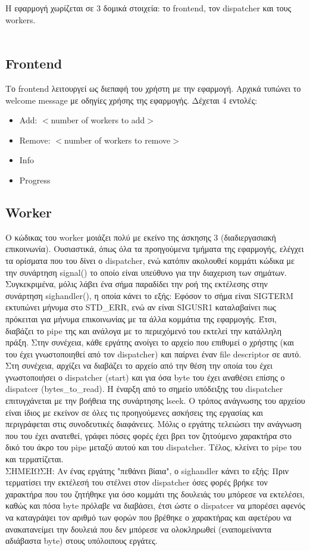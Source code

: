 \documentclass{article}
\begin{document}
	Η εφαρμογή χωρίζεται σε 3 δομικά στοιχεία: το frontend, τον dispatcher και τους workers.\\
	\\
	
	\subsection*{Frontend}

	Το frontend λειτουργεί ως διεπαφή του χρήστη με την εφαρμογή. Αρχικά τυπώνει το welcome message με οδηγίες χρήσης της εφαρμογής. Δέχεται 4 εντολές:
	\begin{itemize}
		\item Add: $<$number of workers to add$>$
		\item Remove: $<$number of workers to remove$>$
		\item Info
		\item Progress
	\end{itemize}


	\subsection{Worker}

	Ο κώδικας του worker μοιάζει πολύ με εκείνο της άσκησης 3 (διαδιεργασιακή επικοινωνία). Ουσιαστικά, όπως όλα τα προηγούμενα τμήματα της εφαρμογής, ελέγχει τα ορίσματα που του δίνει ο dispatcher, ενώ κατόπιν ακολουθεί κομμάτι κώδικα με την συνάρτηση signal() το οποίο είναι υπεύθυνο για την διαχεριση των σημάτων. Συγκεκριμένα, μόλις λάβει ένα σήμα παραδίδει την ροή της εκτέλεσης στην συνάρτηση sighandler(), η οποία κάνει το εξής: Εφόσον το σήμα είναι SIGTERM εκτυπώνει μήνυμα στο STD\_ERR, ενώ αν είναι SIGUSR1 καταλαβαίνει πως πρόκειται για μήνυμα επικοινωνίας με τα άλλα κομμάτια της εφαρμογής. Έτσι, διαβάζει το pipe της και ανάλογα με το περιεχόμενό του εκτελεί την κατάλληλη πράξη. Στην συνέχεια, κάθε εργάτης ανοίγει το αρχείο που επιθυμεί ο χρήστης (και του έχει γνωστοποιηθεί από τον dispatcher) και παίρνει έναν file descriptor σε αυτό. Στη συνέχεια, αρχίζει να διαβάζει το αρχείο από την θέση την οποία του έχει γνωστοποιήσει ο dispatcher (start) και για όσα byte του έχει αναθέσει επίσης ο dispatcer (bytes\_to\_read). Η έναρξη από το σημείο υπόδειξης του dispatcher επιτυγχάνεται με την βοήθεια της συνάρτησης lseek. Ο τρόπος ανάγνωσης του αρχείου είναι ίδιος με εκείνον σε όλες τις προηγούμενες ασκήσεις της εργασίας και περιγράφεται στις συνοδευτικές διαφάνειες. Μόλις ο εργάτης τελειώσει την ανάγνωση που του έχει ανατεθεί, γράφει πόσες φορές έχει βρει τον ζητούμενο χαρακτήρα στο δικό του άκρο του pipe μεταξύ αυτού και του dispatcher. Τέλος, κλείνει το pipe του και τερματίζεται. \\

\noindent ΣΗΜΕΙΩΣΗ: Αν ένας εργάτης "πεθάνει βίαια", ο sighandler κάνει το εξής: Πριν τερματίσει την εκτέλεσή του στέλνει στον dispatcher όσες φορές βρήκε τον χαρακτήρα που του ζητήθηκε για όσο κομμάτι της δουλειάς του μπόρεσε να εκτελέσει, καθώς και πόσα byte πρόλαβε να διαβάσει, έτσι ώστε ο dispatcer να μπορέσει αφενός να καταγράψει τον αριθμό των φορών που βρέθηκε ο χαρακτήρας και αφετέρου να ανακατανείμει την δουλειά που δεν μπόρεσε να ολοκληρωθεί (εναπομείναντα αδιάβαστα byte) στους υπόλοιπους εργάτες.
	
\end{document}
